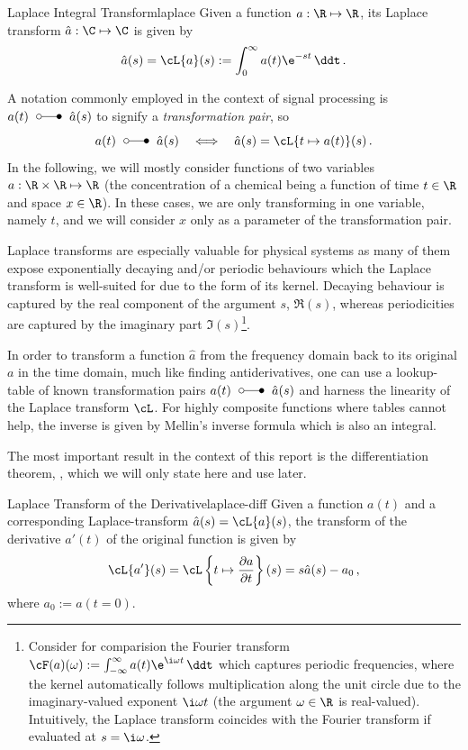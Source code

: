 \documentclass{prettytex/ox/mmsc-special-topic}
\begin{document}
  \begin{definition}{Laplace Integral Transform}{laplace}
    Given a function $a: \R \mapsto \R$, its Laplace transform $\hat{a}: \C \mapsto \C$ is given by
    $$\hat{a}(s) = \cL\{a\}(s) := \int_{0}^{\infty} a(t) \e^{-st} \,\ddt\,.$$
  \end{definition}

  A notation commonly employed in the context of signal processing is $a(t) \;\laplace\; \hat{a}(s)$ to signify a \textit{transformation pair}, so
  $$a(t) \;\laplace\; \hat{a}(s) \quad\Longleftrightarrow\quad \hat{a}(s) = \cL\{t \mapsto a(t)\}(s)\,.$$
  In the following, we will mostly consider functions of two variables $a: \R \times \R \mapsto \R$ (the concentration of a chemical being a function of time $t \in \R$ and space $x \in \R$).
  In these cases, we are only transforming in one variable, namely $t$, and we will consider $x$ only as a parameter of the transformation pair.

  Laplace transforms are especially valuable for physical systems as many of them expose exponentially decaying and/or periodic behaviours which the Laplace transform is well-suited for due to the form of its kernel.
  Decaying behaviour is captured by the real component of the argument $s$, $\Re(s)$, whereas periodicities are captured by the imaginary part $\Im(s)$\footnote{Consider for comparision the Fourier transform $\cF(a)(\omega) := \int_{-\infty}^{\infty} a(t) \e^{\i \omega t} \,\ddt$ which captures periodic frequencies, where the kernel automatically follows multiplication along the unit circle due to the imaginary-valued exponent $\i\omega t$ (the argument $\omega \in \R$ is real-valued). Intuitively, the Laplace transform coincides with the Fourier transform if evaluated at $s = \i \omega$.}.

  In order to transform a function $\hat{a}$ from the frequency domain back to its original $a$ in the time domain, much like finding antiderivatives, one can use a lookup-table of known transformation pairs $a(t)\;\laplace\;\hat{a}(s)$ and harness the linearity of the Laplace transform $\cL$.
  For highly composite functions where tables cannot help, the inverse is given by Mellin's inverse formula which is also an integral.

  The most important result in the context of this report is the differentiation theorem, , which we will only state here and use later.

  \begin{theorem}{Laplace Transform of the Derivative}{laplace-diff}
    Given a function $a(t)$ and a corresponding Laplace-transform $\hat{a}(s) = \cL\{a\}(s)$, the transform of the derivative $a'(t)$ of the original function is given by
    $$\cL\{a'\}(s) = \cL\left\{t \mapsto \frac{\partial a}{\partial t}\right\}(s) = s\hat{a}(s) - a_0\,,$$
    where $a_0 := a(t=0)$.
  \end{theorem}
\end{document}

